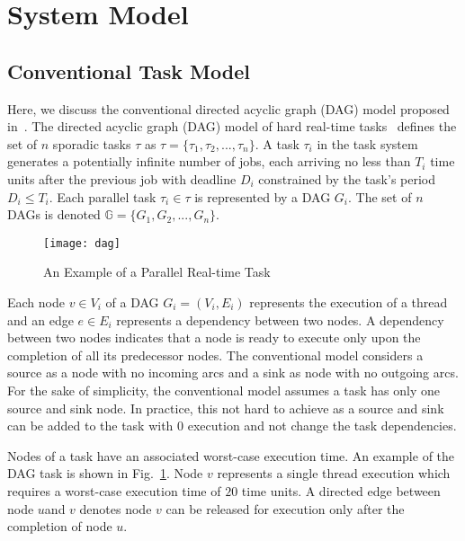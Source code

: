 \section{System Model}

\subsection{Conventional Task Model}
Here, we discuss the conventional directed acyclic graph (DAG) model proposed in~\cite{li2014analysis}.
The directed acyclic graph (DAG) model of hard real-time
tasks~\cite{li2014analysis} defines the set of ${n}$ sporadic tasks ${\tau}$ as
${\tau = \{\tau_1,\tau_2, ..., \tau_n\}}$. A task ${\tau_i}$
in the task system generates a potentially infinite number of jobs,
each arriving no less than ${T_i}$ time units after the previous
job with deadline ${D_i}$ constrained by the task's period
${D_i \leq T_i}$. Each parallel task ${\tau_i \in \tau}$
is represented by a DAG ${G_i}$. The set of ${n}$ DAGs is
denoted ${\mathbb{G} = \{G_1, G_2, ..., G_n\}}$.

\begin{figure}[!h]
  \centering
  \texttt{[image: dag]}
  \caption{An Example of a Parallel Real-time Task}
  \label{fig:dag}
\end{figure}
  


Each node ${v \in V_i}$ of a DAG ${G_i =
  (V_i, E_i)}$ represents the 
execution of a thread and an edge ${e \in E_i}$ represents a
dependency between two nodes. A dependency between two nodes indicates
that a node is ready to execute only upon the completion of all its
predecessor nodes. The conventional model considers a source as a node with no incoming
arcs and a sink as node with no outgoing arcs. For the sake of
simplicity, the conventional model assumes a task has only one source and sink node. In
practice, this not hard to achieve as a source and sink can be added
to the task with $0$ execution and not change the task dependencies.

Nodes of a task have an associated worst-case execution time. 
An example of the DAG task is shown in Fig.~\ref{fig:dag}. Node $v$ represents a single thread execution which requires a worst-case execution time of $20$ time units. A directed edge between node $u$and $v$ denotes node $v$ can be released for execution only after the completion of node $u$.

